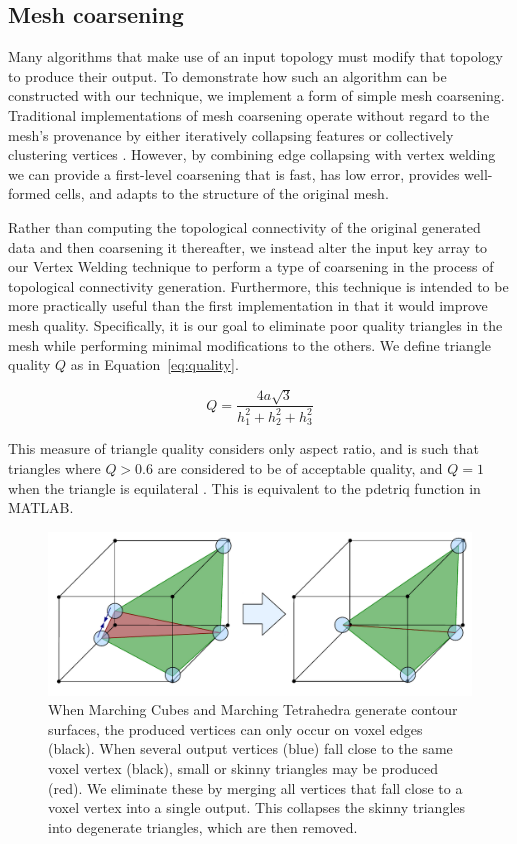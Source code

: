 \documentclass[10pt,journal,cspaper,compsoc]{IEEEtran}
\begin{document}
\subsection{Mesh coarsening}
\label{sec:coarsening}
Many algorithms that make use of an input topology must modify that topology to produce their output. To demonstrate how such an algorithm can be constructed with our technique, we implement a form of simple mesh coarsening. Traditional implementations of mesh coarsening operate without regard to the mesh's provenance by either iteratively collapsing features \cite{Potter2011} or collectively clustering vertices \cite{DeCoro2007}.  However, by combining edge collapsing with vertex welding we can provide a first-level coarsening that is fast, has low error, provides well-formed cells, and adapts to the structure of the original mesh.

Rather than computing the topological connectivity of the original generated data and then coarsening it thereafter, we instead alter the input key array to our Vertex Welding technique to perform a type of coarsening in the process of topological connectivity generation. Furthermore, this technique is intended to be more practically useful than the first implementation in that it would improve mesh quality. Specifically, it is our goal to eliminate poor quality triangles in the mesh while performing minimal modifications to the others. We define triangle quality $Q$ as in Equation~\ref{eq:quality}.

\begin{equation}
\label{eq:quality}
	Q = \frac{4a\sqrt{3}}{h_1^2 + h_2^2 + h_3^2}
\end{equation}

This measure of triangle quality considers only aspect ratio, and is such that triangles where $Q > 0.6$ are considered to be of acceptable quality, and $Q = 1$ when the triangle is equilateral \cite{Bank2003}. This is equivalent to the pdetriq function in MATLAB.

\begin{figure}[!tb]
\begin{center}
\includegraphics[width=\columnwidth]{SkinnyCollapse.pdf}
\caption{When Marching Cubes and Marching Tetrahedra generate contour surfaces, the produced vertices can only occur on voxel edges (black). When several output vertices (blue) fall close to the same voxel vertex (black), small or skinny triangles may be produced (red). We eliminate these by merging all vertices that fall close to a voxel vertex into a single output. This collapses the skinny triangles into degenerate triangles, which are then removed. }
\label{fig:SkinnyCollapse}
\end{center}
\end{figure}
\end{document}
